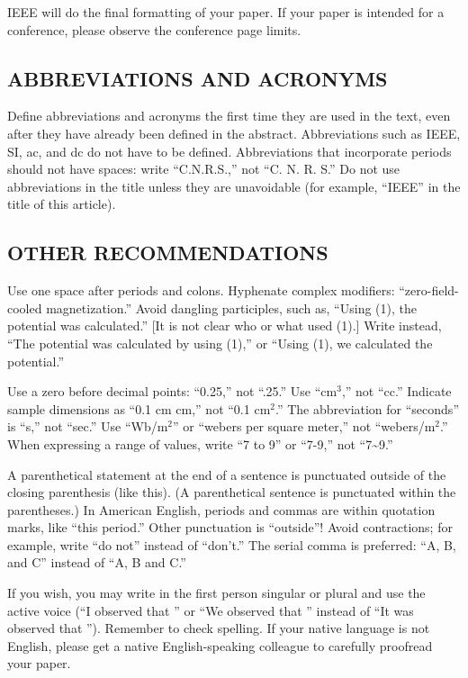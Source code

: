 \documentclass{IEEEoj}
\begin{document}
IEEE will do the final formatting of your paper. If your paper is intended 
for a conference, please observe the conference page limits.

\subsection{ABBREVIATIONS AND ACRONYMS}
Define abbreviations and acronyms the first time they are used in the text, 
even after they have already been defined in the abstract. Abbreviations 
such as IEEE, SI, ac, and dc do not have to be defined. Abbreviations that 
incorporate periods should not have spaces: write ``C.N.R.S.,'' not ``C. N. 
R. S.'' Do not use abbreviations in the title unless they are unavoidable 
(for example, ``IEEE'' in the title of this article).

\subsection{OTHER RECOMMENDATIONS}
Use one space after periods and colons. Hyphenate complex modifiers: 
``zero-field-cooled magnetization.'' Avoid dangling participles, such as, 
``Using (1), the potential was calculated.'' [It is not clear who or what 
used (1).] Write instead, ``The potential was calculated by using (1),'' or 
``Using (1), we calculated the potential.''

Use a zero before decimal points: ``0.25,'' not ``.25.'' Use ``cm$^3$,'' not 
``cc.'' Indicate sample dimensions as ``0.1 cm  cm,'' not 
``0.1  cm$^{2}$.'' The abbreviation for ``seconds'' is ``s,'' 
not ``sec.'' Use ``Wb/m$^{2}$'' or ``webers per square meter,'' not 
``webers/m$^2$.'' When expressing a range of values, write ``7 to 9'' or 
``7-9,'' not ``7\textasciitilde 9.''

A parenthetical statement at the end of a sentence is punctuated outside of 
the closing parenthesis (like this). (A parenthetical sentence is punctuated 
within the parentheses.) In American English, periods and commas are within 
quotation marks, like ``this period.'' Other punctuation is ``outside''! 
Avoid contractions; for example, write ``do not'' instead of ``don't.'' The 
serial comma is preferred: ``A, B, and C'' instead of ``A, B and C.''

If you wish, you may write in the first person singular or plural and use 
the active voice (``I observed that \textellipsis'' or ``We observed that \textellipsis'' 
instead of ``It was observed that \textellipsis''). Remember to check spelling. If 
your native language is not English, please get a native English-speaking 
colleague to carefully proofread your paper.
\end{document}
